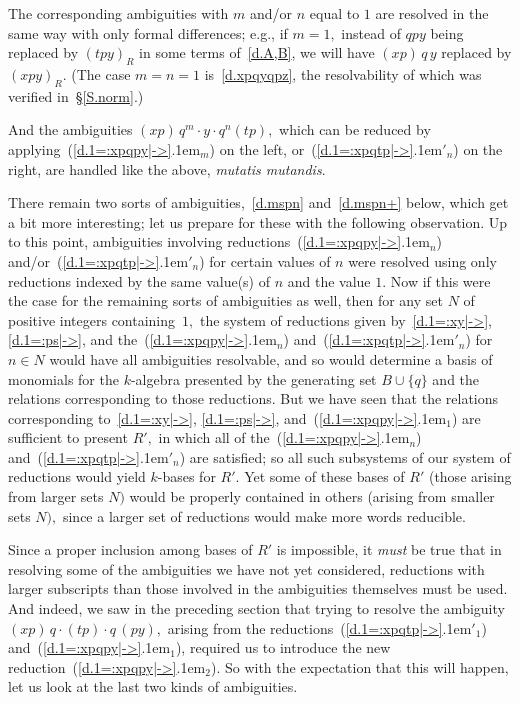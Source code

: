 \documentclass{amsart}
\begin{document}
The corresponding ambiguities with $m$ and/or $n$ equal to $1$
are resolved in the same way with only
formal differences; e.g., if $m=1,$ instead of $qpy$ being replaced
by $(tpy)_R$ in some terms of~\eqref{d.A,B},
we will have $(xp)\,q\,y$ replaced by $(xpy)_R.$
(The case $m=n=1$ is~\eqref{d.xpqyqpz}, the resolvability of
which was verified in~\S\ref{S.norm}.)

And the ambiguities $(xp)\,q^m\cdot y \cdot q^n (tp),$
which can be reduced by applying~({{\setlength{\mathsurround}{0em}\ref{d.1=:xpqpy|->}\kern.1em$_{{m}}$}}) on
the left, or~({{\setlength{\mathsurround}{0em}\ref{d.1=:xpqtp|->}\kern.1em$'_{{n}}$}}) on the right, are handled like the above,
{\em mutatis mutandis}.

There remain two sorts of ambiguities,~\eqref{d.mspn}
and~\eqref{d.mspn+} below, which get a bit more
interesting; let us prepare for these with the following observation.
Up to this point, ambiguities involving
reductions~({{\setlength{\mathsurround}{0em}\ref{d.1=:xpqpy|->}\kern.1em$_{{n}}$}}) and/or~({{\setlength{\mathsurround}{0em}\ref{d.1=:xpqtp|->}\kern.1em$'_{{n}}$}}) for certain
values of $n$ were resolved using only reductions indexed by
the same value(s) of $n$ and the value $1.$
Now if this were the case for the remaining sorts of ambiguities
as well, then for any set $N$ of positive integers containing~$1,$
the system of reductions given by~\eqref{d.1=:xy|->},
\eqref{d.1=:ps|->}, and the~({{\setlength{\mathsurround}{0em}\ref{d.1=:xpqpy|->}\kern.1em$_{{n}}$}}) and~({{\setlength{\mathsurround}{0em}\ref{d.1=:xpqtp|->}\kern.1em$'_{{n}}$}}) for $n\in N$
would have all ambiguities resolvable, and so would determine a
basis of monomials for the $\!k\!$-algebra presented by the generating
set $B\cup\{q\}$ and the relations corresponding to those reductions.
But we have seen that the relations corresponding to~\eqref{d.1=:xy|->},
\eqref{d.1=:ps|->}, and~({{\setlength{\mathsurround}{0em}\ref{d.1=:xpqpy|->}\kern.1em$_{{1}}$}}) are sufficient to
present $R',$ in which all of the~({{\setlength{\mathsurround}{0em}\ref{d.1=:xpqpy|->}\kern.1em$_{{n}}$}}) and~({{\setlength{\mathsurround}{0em}\ref{d.1=:xpqtp|->}\kern.1em$'_{{n}}$}}) are
satisfied; so all such subsystems of our system of reductions
would yield $\!k\!$-bases for $R'.$
Yet some of these bases of $R'$ (those arising from larger sets $N)$
would be properly contained in others (arising from smaller sets $N),$
since a larger set of reductions would make more words reducible.

Since a proper inclusion among bases of
$R'$ is impossible, it {\em must} be true that in resolving some
of the ambiguities we have not yet considered,
reductions with larger subscripts than those
involved in the ambiguities themselves must be used.
And indeed, we saw in the preceding section that trying to
resolve the ambiguity $(xp)\,q\cdot(tp)\cdot q\,(py),$
arising from the reductions~({{\setlength{\mathsurround}{0em}\ref{d.1=:xpqtp|->}\kern.1em$'_{{1}}$}}) and~({{\setlength{\mathsurround}{0em}\ref{d.1=:xpqpy|->}\kern.1em$_{{1}}$}}), required
us to introduce the new reduction~({{\setlength{\mathsurround}{0em}\ref{d.1=:xpqpy|->}\kern.1em$_{{2}}$}}).
So with the expectation that this will happen, let us look
at the last two kinds of ambiguities.
\end{document}
